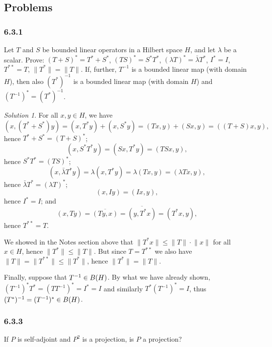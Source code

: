 \documentclass{report}
\newcommand{\norm}[1]{{\lVert #1 \rVert}}
\let\sc\relax
\newcommand{\sc}[1]{\mathscr{#1}}
\theoremstyle{remark}
\newtheorem*{solution}{Solution}
\begin{document}
\subsection*{Problems}

\subsubsection*{6.3.1}
Let $T$ and $S$ be bounded linear operators in a Hilbert space $H$, and let $\lambda$ be a scalar. Prove: $(T+S)^* = T^* + S^*$, $(TS)^* = S^* T^*$, $(\lambda T)^* = \bar \lambda T^*$, $I^* = I$, $T^{**} = T$, $\norm{T^*} = \norm T$. If, further, $T^{-1}$ is a bounded linear map (with domain $H$), then also $(T^*)^{-1}$ is a bounded linear map (with domain $H$) and $(T^{-1})^* = (T^*)^{-1}$.

\begin{solution}
  For all $x,y \in H$, we have
  \begin{equation*}
    (x, (T^* + S^*)y) = (x, T^* y) + (x, S^* y) = (Tx,y) + (Sx,y) = ((T + S)x, y),
  \end{equation*}
  hence $T^* + S^* = (T+S)^*$;
  \begin{equation*}
    (x, S^*T^*y) = (Sx, T^*y) = (TSx,y),
  \end{equation*}
  hence $S^*T^* = (TS)^*$;
  \begin{equation*}
    (x, \bar \lambda T^* y) = \lambda (x, T^*y) = \lambda (Tx,y) = (\lambda Tx, y),
  \end{equation*}
  hence $\bar \lambda T^* = (\lambda T)^*$;
  \begin{equation*}
    (x, Iy) = (Ix,y),
  \end{equation*}
  hence $I^* = I$; and
  \begin{equation*}
    (x,Ty) = \overline{(Ty,x)} = \overline{(y,T^*x)} = (T^*x, y),
  \end{equation*}
  hence $T^{**} = T$.

  We showed in the Notes section above that $\norm{T^*x} \le \norm T \cdot \norm x$ for all $x \in H$, hence $\norm{T^*} \le \norm T$. But since $T = T^{**}$ we also have $\norm T = \norm{T^{**}} \le \norm{T^*}$, hence $\norm{T^*} = \norm T$.

  Finally, suppose that $T^{-1} \in \sc B(H)$. By what we have already shown, $(T^{-1})^* T^* = (T T^{-1})^* = I^* = I$ and similarly $T^* (T^{-1})^* = I$, thus $(T^*)^{-1} = (T^{-1})^* \in \sc B(H)$.
\end{solution}

\subsubsection*{6.3.3}
If $P$ is self-adjoint and $P^2$ is a projection, is $P$ a projection?
\end{document}

